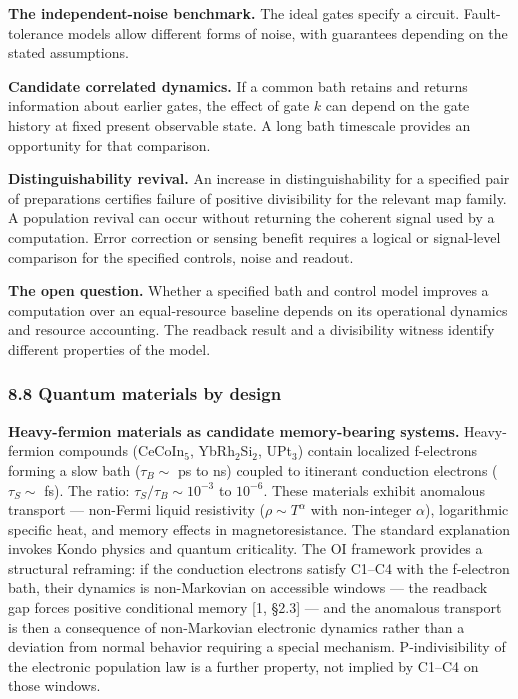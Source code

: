 \documentclass[
]{article}
\begin{document}
\textbf{The independent-noise benchmark.} The ideal gates specify a
circuit. Fault-tolerance models allow different forms of noise, with
guarantees depending on the stated assumptions.

\textbf{Candidate correlated dynamics.} If a common bath retains and
returns information about earlier gates, the effect of gate \(k\) can
depend on the gate history at fixed present observable state. A long
bath timescale provides an opportunity for that comparison.

\textbf{Distinguishability revival.} An increase in distinguishability
for a specified pair of preparations certifies failure of positive
divisibility for the relevant map family. A population revival can occur
without returning the coherent signal used by a computation. Error
correction or sensing benefit requires a logical or signal-level
comparison for the specified controls, noise and readout.

\textbf{The open question.} Whether a specified bath and control model
improves a computation over an equal-resource baseline depends on its
operational dynamics and resource accounting. The readback result and a
divisibility witness identify different properties of the model.

\hypertarget{quantum-materials-by-design}{%
\subsubsection{8.8 Quantum materials by
design}\label{quantum-materials-by-design}}

\textbf{Heavy-fermion materials as candidate memory-bearing systems.}
Heavy-fermion compounds (CeCoIn\(_5\), YbRh\(_2\)Si\(_2\), UPt\(_3\))
contain localized f-electrons forming a slow bath (\(\tau_B \sim\) ps to
ns) coupled to itinerant conduction electrons (\(\tau_S \sim\) fs). The
ratio: \(\tau_S / \tau_B \sim 10^{-3}\) to \(10^{-6}\). These materials
exhibit anomalous transport --- non-Fermi liquid resistivity
(\(\rho \sim T^\alpha\) with non-integer \(\alpha\)), logarithmic
specific heat, and memory effects in magnetoresistance. The standard
explanation invokes Kondo physics and quantum criticality. The OI
framework provides a structural reframing: if the conduction electrons
satisfy C1--C4 with the f-electron bath, their dynamics is non-Markovian
on accessible windows --- the readback gap forces positive conditional
memory {[}1, §2.3{]} --- and the anomalous transport is then a
consequence of non-Markovian electronic dynamics rather than a deviation
from normal behavior requiring a special mechanism. P-indivisibility of
the electronic population law is a further property, not implied by
C1--C4 on those windows.
\end{document}
